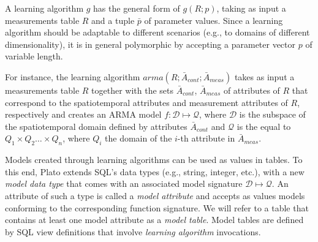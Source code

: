 A learning algorithm $g$ has the general form of $g(R;p)$, taking as input a measurements table $R$ and a tuple $\bar{p}$ of parameter values. Since a learning algorithm should be adaptable to different scenarios (e.g., to domains of different dimensionality), it is in general polymorphic by accepting a parameter vector $p$ of variable length.

\vspace*{0.5cm}
\begin{example}
For instance, the learning algorithm $arma(R;{\bar{A}_{cont}}; \bar{A}_{meas})$ takes as input a measurements table $R$ together with the sets $\bar{A}_{cont}$, $\bar{A}_{meas}$ of attributes of $R$ that correspond to the spatiotemporal attributes and measurement attributes of $R$, respectively and creates an ARMA model $f:\mathcal{D}\mapsto\mathcal{Q}$, where $\mathcal{D}$ is the subspace of the spatiotemporal domain defined by attributes $\bar{A}_{cont}$ and $\mathcal{Q}$ is the equal to $Q_1 \times Q_2 \ldots \times Q_n$, where $Q_i$ the domain of the $i$-th attribute in $\bar{A}_{meas}$.
\end{example}  
\vspace*{0.5cm}

Models created through learning algorithms can be used as values in tables. To this end, Plato extends SQL's data types (e.g., string, integer, etc.), with a new {\em model data type} that comes with an associated model signature $\mathcal{D}\mapsto \mathcal{Q}$. An attribute of such a type is called a {\em model attribute} and accepts as values models conforming to the corresponding function signature. We will refer to a table that contains at least one model attribute as a {\em model table}. Model tables are defined by SQL view definitions that involve {\em learning algorithm} invocations. 

